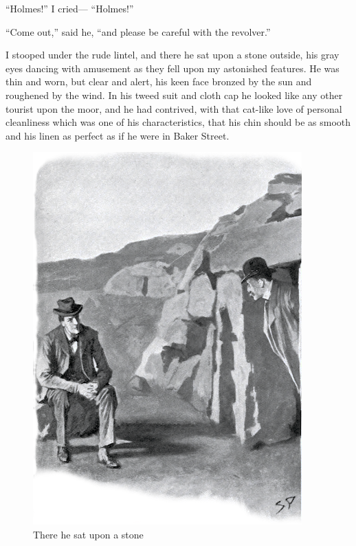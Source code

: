 \documentclass[paper=5.5in:8.5in,BCOR=7mm,twoside,DIV=calc,12pt,usegeometry,openany,chapterprefix,endperiod]{scrbook} %
\begin{document}
\enquote{Holmes!} I cried\nobreakdash--- \enquote{Holmes!}

\enquote{Come out,} said he, \enquote{and please be careful with the revolver.}

I stooped under the rude lintel, and there he sat upon a stone outside, his gray eyes dancing with amusement as they fell upon my astonished features. He was thin and worn, but clear and alert, his keen face bronzed by the sun and roughened by the wind. In his tweed suit and cloth cap he looked like any other tourist upon the moor, and he had contrived, with that cat-like love of personal cleanliness which was one of his characteristics, that his chin should be as smooth and his linen as perfect as if he were in Baker Street.

\begin{figure}[tbph]
\centering
\includegraphics[width=\linewidth]{12_therehesat}
\caption{There he sat upon a stone}
\end{figure}
\end{document}
